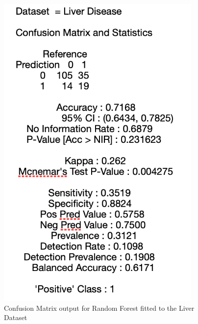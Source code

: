 \begin{figure}[!htbp]
    \centering
    \begin{minipage}{0.45\textwidth}
        \centering
        \includegraphics[width=0.9\textwidth]{ThesisTemplate/appendix/images/Chapter5Appendix/ConfusionMatrix/LiverDisease.png} 
        \caption{Confusion Matrix output for Random Forest fitted to the Liver Dataset}
        \label{fig:my_label}
    \end{minipage}\hfill
    \begin{minipage}{0.45\textwidth}
        \centering

\end{minipage}
\end{figure}
